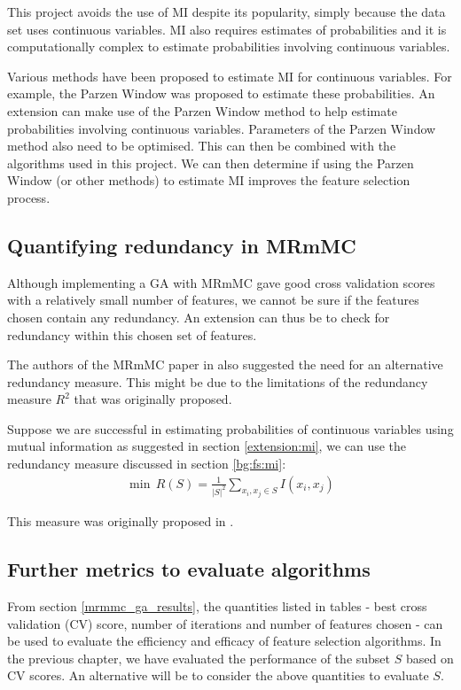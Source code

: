 \documentclass[12pt, twoside, a4paper]{report}
\begin{document}
This project avoids the use of MI despite its popularity, simply because the data set uses continuous variables. MI also requires estimates of probabilities and it is computationally complex to estimate probabilities involving continuous variables.

Various methods have been proposed to estimate MI for continuous variables. For example, the Parzen Window \cite{RefWorks:183} was proposed to estimate these probabilities. An extension can make use of the Parzen Window method to help estimate probabilities involving continuous variables. Parameters of the Parzen Window method also need to be optimised. This can then be combined with the algorithms used in this project. We can then determine if using the Parzen Window (or other methods) to estimate MI improves the feature selection process.


\subsection{Quantifying redundancy in MRmMC}

Although implementing a GA with MRmMC gave good cross validation scores with a relatively small number of features, we cannot be sure if the features chosen contain any redundancy. An extension can thus be to check for redundancy within this chosen set of features.

The authors of the MRmMC paper in \cite{RefWorks:187} also suggested the need for an alternative redundancy measure. This might be due to the limitations of the redundancy measure $R^2$ that was originally proposed.

Suppose we are successful in estimating probabilities of continuous variables using mutual information as suggested in section \ref{extension:mi}, we can use the redundancy measure discussed in section \ref{bg:fs:mi}:
\begin{align*}
\min \, R(S) = \frac{1}{|S|^2} \sum_{x_i, x_j \in S} I(x_i, x_j)
\end{align*}

This measure was originally proposed in \cite{RefWorks:182}.


\subsection{Further metrics to evaluate algorithms}

From section \ref{mrmmc_ga_results}, the quantities listed in tables - best cross validation (CV) score, number of iterations and number of features chosen - can be used to evaluate the efficiency and efficacy of feature selection algorithms. In the previous chapter, we have evaluated the performance of the subset $S$ based on CV scores. An alternative will be to consider the above quantities to evaluate $S$.
\end{document}
